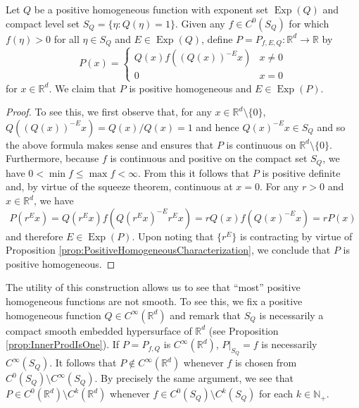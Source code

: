 \documentclass[11pt]{article}
\newenvironment{example}
  {\pushQED{\qed}\renewcommand{\qedsymbol}{$\triangle$}\examplex}
  {\popQED\endexamplex}
\theoremstyle{remark}
\newcommand*{\myproofname}{Proof}
\newenvironment{subproof}[1][\myproofname]{\begin{proof}[#1]\renewcommand*{\qedsymbol}{$\mathbin{/\mkern-6mu/}$}}{\end{proof}}
\newcommand\Exp{\operatorname{Exp}}
\begin{document}
\begin{example}\label{exp:Weierstrass}\normalfont
Let $Q$ be a positive homogeneous function with exponent set $\Exp(Q)$ and compact level set $S_Q=\{\eta:Q(\eta)=1\}$. Given any $f\in C^0(S_Q)$ for which $f(\eta)>0$ for all $\eta\in S_Q$ and $E\in \Exp(Q)$, define $P=P_{f,E,Q}:\mathbb{R}^d\to\mathbb{R}$ by
\begin{equation*}
P(x)=\begin{cases}
Q(x)f\left((Q(x))^{-E}x\right) & x\neq 0\\
0 & x=0
\end{cases}
\end{equation*}
for $x\in\mathbb{R}^d$. We claim that $P$ is positive homogeneous and $E\in\Exp(P)$.

\begin{subproof}To see this, we first observe that, for any $x\in\mathbb{R}^d\setminus \{0\}$, $Q((Q(x))^{-E}x)=Q(x)/Q(x)=1$ and hence $Q(x)^{-E}x\in S_Q$ and so the above formula makes sense and ensures that $P$ is continuous on $\mathbb{R}^d\setminus\{0\}$. Furthermore, because $f$ is continuous and positive on the compact set $S_Q$, we have $0<\min f\leq \max f<\infty$. From this it follows that $P$ is positive definite and, by virtue of the squeeze theorem, continuous at $x=0$. For any $r>0$ and $x\in\mathbb{R}^d$, we have
\begin{equation*}
P(r^Ex)=Q(r^Ex)f(Q(r^Ex)^{-E}r^Ex)=rQ(x)f(Q(x)^{-E}x)=rP(x)
\end{equation*}
and therefore $E\in\Exp(P)$. Upon noting that $\{r^E\}$ is contracting by virtue of Proposition \ref{prop:PositiveHomogeneousCharacterization}, we conclude that $P$ is positive homogeneous.
\end{subproof}
\noindent The utility of this construction allows us to see that ``most'' positive homogeneous functions are not smooth. To see this, we fix a positive homogeneous function $Q\in C^{\infty}(\mathbb{R}^d)$ and remark that $S_Q$ is necessarily a compact smooth embedded hypersurface of $\mathbb{R}^d$ (see Proposition \ref{prop:InnerProdIsOne}). If $P=P_{f,Q}$ is $C^\infty(\mathbb{R}^d)$, $P\vert_{S_Q}=f$ is necessarily $C^\infty(S_Q)$. It follows that $P\notin C^\infty(\mathbb{R}^d)$ whenever $f$ is chosen from $C^0(S_Q)\setminus C^\infty(S_Q)$. By precisely the same argument, we see that $P\in C^0(\mathbb{R}^d)\setminus C^k(\mathbb{R}^d)$ whenever $f\in C^0(S_Q)\setminus C^k(S_Q)$ for each $k\in\mathbb{N}_+$.\\


\end{example}
\end{document}
